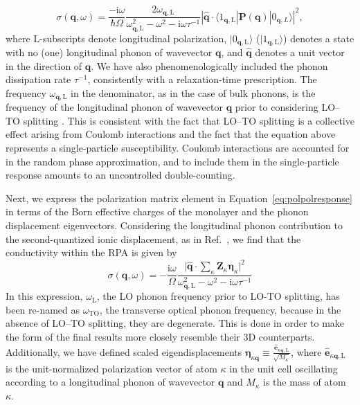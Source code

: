 \documentclass[aps,prb,twocolumn,
	           groupedaddress,superscriptaddress,
               amsfonts,amssymb,amsmath,floatfix,
	           citeautoscript]{revtex4-1}
\newcommand{\iu}{\mathrm{i}}
\begin{document}
\begin{equation}
    \sigma(\mathbf{q},\omega) = \frac{-\iu\omega}{\hbar\Omega} \frac{2\omega_{\mathbf{q},\mathrm{L}}}{\omega^2_{\mathbf{q},\mathrm{L}}-\omega^2-\iu\omega\tau^{-1}}|\hat{\mathbf{q}}\cdot\langle 1_{\mathbf{q},\mathrm{L}}|\mathbf{P}(\mathbf{q})|0_{\mathbf{q},L}\rangle|^2,
    \label{eq:polpolresponse}
\end{equation}
where L-subscripts denote longitudinal polarization, $|0_{\mathbf{q},\mathrm{L}}\rangle$ ($|1_{\mathbf{q},\mathrm{L}}\rangle$) denotes a state with no (one) longitudinal phonon of wavevector $\mathbf{q}$, and $\hat{\mathbf{q}}$ denotes a unit vector in the direction of $\mathbf{q}$. We have also phenomenologically included the phonon dissipation rate $\tau^{-1}$, consistently with  a relaxation-time prescription.  The frequency $\omega_{\mathbf{q},\mathrm{L}}$ in the denominator, as in the case of bulk phonons, is the frequency of the longitudinal phonon of wavevector $\mathbf{q}$ prior to considering LO--TO splitting \cite{BornHuang:1954}.
This is consistent with the fact that LO--TO splitting is a collective effect arising from Coulomb interactions and the fact that the equation above represents a single-particle susceptibility. Coulomb interactions are accounted for in the random phase approximation, and to include them in the single-particle response amounts to an uncontrolled double-counting. 

Next, we express the polarization matrix element in Equation~\eqref{eq:polpolresponse} in terms of the Born effective charges of the monolayer and the phonon displacement eigenvectors. Considering the longitudinal phonon contribution to the second-quantized ionic displacement, as in Ref.~, we find that the conductivity within the RPA is given by
\begin{equation}
    \sigma(\mathbf{q},\omega) = -\frac{\iu\omega }{\Omega}\frac{\Big|\hat{\mathbf{q}}\cdot\sum\limits_{\kappa}\mathbf{Z}_{\kappa}\boldsymbol{\eta}_{\kappa} \Big|^2}{\omega^2_{\mathbf{q},\mathrm{L}}-\omega^2-\iu\omega\tau^{-1}}
    \label{eq:conductivity_simplified}
\end{equation}
  In this expression, $\omega_\mathrm{L}$, the LO phonon frequency prior to LO-TO splitting, has been re-named as $\omega_{\mathrm{TO}}$, the transverse optical phonon frequency, because in the absence of LO--TO splitting, they are degenerate. This is done in order to make the form of the final results more closely resemble their 3D counterparts. 
Additionally, we have defined scaled eigendisplacements $\boldsymbol{\eta}_{\kappa\mathbf{q}}\equiv \frac{\hat{\mathbf{e}}_{\kappa\mathbf{q},\mathrm{L}}}{\sqrt{M_{\kappa}}}$, where $\hat{\mathbf{e}}_{\kappa\mathbf{q},\mathrm{L}}$ is the unit-normalized polarization vector of atom $\kappa$ in the unit cell oscillating according to a longitudinal phonon of wavevector $\mathbf{q}$ and $M_{\kappa}$ is the mass of atom $\kappa$. 
\end{document}
